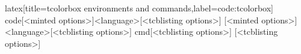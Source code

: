 %
\begin{code}[firstnumber=last]{latex}[title={tcolorbox environments and commands},label=code:tcolorbox]
{code}[<minted options>]{<language>}[<tcblisting options>]
[<minted options>]{<language>}[<tcblisting options>]
{cmd}[<tcblisting options>]
[<tcblisting options>]
\end{code}

\begin{comment}

\clearpage
\subsection{subsection 1}

\section{Test appendix 2}

\section{Test appendix 3}
\clearpage
\subsection{subsection 1}
\clearpage
\subsection{subsection 2}
\clearpage

\end{comment}
